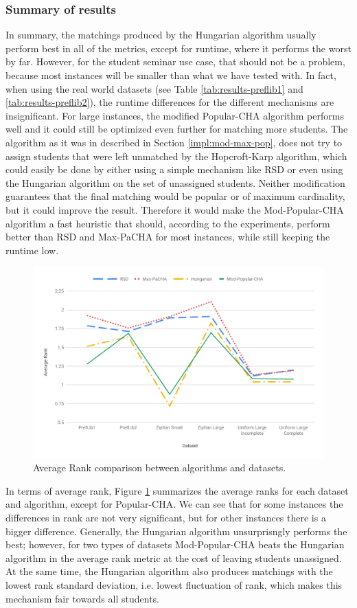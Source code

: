 \subsubsection{Summary of results}
In summary, the matchings produced by the Hungarian algorithm usually perform best in all of the metrics, except for runtime, where it performs the worst by far. However, for the student seminar use case, that should not be a problem, because most instances will be smaller than what we have tested with. In fact, when using the real world datasets (see Table \ref{tab:results-preflib1} and \ref{tab:results-preflib2}), the runtime differences for the different mechanisms are insignificant. For large instances, the modified Popular-CHA algorithm performs well and it could still be optimized even further for matching more students. The algorithm as it was in described in Section \ref{impl:mod-max-pop}, does not try to assign students that were left unmatched by the Hopcroft-Karp algorithm, which could easily be done by either using a simple mechanism like RSD or even using the Hungarian algorithm on the set of unassigned students. Neither modification guarantees that the final matching would be popular or of maximum cardinality, but it could improve the result. Therefore it would make the Mod-Popular-CHA algorithm a fast heuristic that should, according to the experiments, perform better than RSD and Max-PaCHA for most instances, while still keeping the runtime low.

\begin{figure}[h!]
  \centering
    \includegraphics[width=0.99\linewidth]{assets/plots/average_ranks_all.pdf}
    \caption{Average Rank comparison between algorithms and datasets.}
    \label{fig:average_ranks}
\end{figure}

In terms of average rank, Figure \ref{fig:average_ranks} summarizes the average ranks for each dataset and algorithm, except for Popular-CHA. We can see that for some instances the differences in rank are not very significant, but for other instances there is a bigger difference. Generally, the Hungarian algorithm unsurprisngly performs the best; however, for two types of datasets Mod-Popular-CHA beats the Hungarian algorithm in the average rank metric at the cost of leaving students unassigned. At the same time, the Hungarian algorithm also produces matchings with the lowest rank standard deviation, i.e. lowest fluctuation of rank, which makes this mechanism fair towards all students.